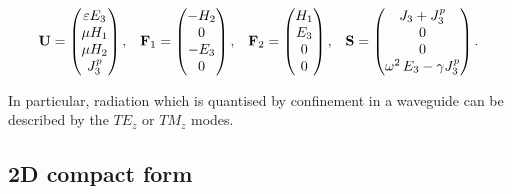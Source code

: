 \begin{equation*}
  \begin{array}{ccccc}
    \mathbf{U} = \begin{pmatrix} \varepsilon E_3 \\ \mu H_1 \\ \mu H_2 \\ J^p_3 \end{pmatrix} ,
 &
   \mathbf{F}_1 = \begin{pmatrix} -H_2 \\ 0 \\ -E_3 \\ 0 \end{pmatrix} ,
 &
   \mathbf{F}_2 = \begin{pmatrix} H_1 \\ E_3 \\ 0 \\ 0 \end{pmatrix} ,
 &
   \mathbf{S} = \begin{pmatrix} J_3 + J^p_3 \\ 0 \\ 0 \\ \omega^2 \, E_3 - \gamma J^p_3 \end{pmatrix} .
  \end{array}
  \:
\end{equation*}

In particular, radiation which is quantised by confinement in a waveguide can be
described by the $TE_z$ or $TM_z$ modes.

\subsection{2D compact form}

